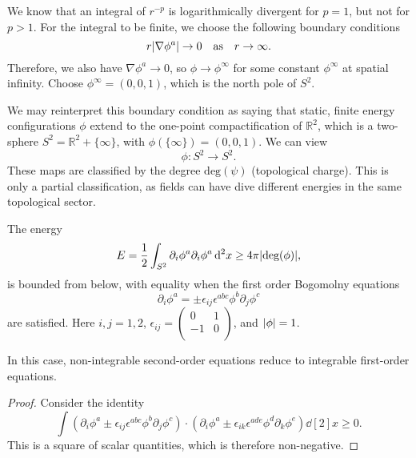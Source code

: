 We know that an integral of $r^{-p}$ is logarithmically divergent for $p = 1$, but not for $p > 1$.
For the integral to be finite, we choose the following boundary conditions
\begin{equation}
  r \abs{\nabla \phi^{a}} \to 0 \quad \text{as} \quad r \to \infty.
\end{equation}
Therefore, we also have $\nabla \phi^{a} \to 0$, so $\phi \to \phi^{\infty}$ for some constant $\phi^\infty$ at spatial infinity.
Choose $\phi^\infty = (0,0,1)$, which is the north pole of $S^2$.

We may reinterpret this boundary condition as saying that static, finite energy configurations $\phi$ extend to the one-point compactification of $\mathbb{R}^2$, which is a two-sphere $S^2 = \mathbb{R}^2 + \{\infty\}$, with $\phi(\{\infty\}) = (0,0,1)$.
We can view
\begin{equation}
  \phi \colon S^2 \to S^2.
\end{equation}
These maps are classified by the degree $\text{deg}(\psi)$ (topological charge). 
This is only a partial classification, as fields can have dive different energies in the same topological sector.

\begin{claim}
  The energy
  \begin{equation}
    E = \frac{1}{2} \int_{S^2} \partial_{i} \phi^{a} \partial_{i} \phi^{a} \dd[2]{x} \geq 4 \pi \abs{\text{deg}(\phi)},
  \end{equation}
  is bounded from below, with equality when the first order Bogomolny equations
  \begin{equation}
    \boxed{\partial_{i} \phi^{a} = \pm \epsilon_{ij} \epsilon^{abc} \phi^{b} \partial_{j} \phi^{c}}
  \end{equation}
  are satisfied. Here $i, j = 1, 2$, $\epsilon_{ij} = 
  \begin{pmatrix}
   0 & 1 \\
   -1 & 0 \\
  \end{pmatrix}$, and $\abs{ \phi} = 1$.
\end{claim}
\begin{leftbar}
  In this case, non-integrable second-order equations reduce to integrable first-order equations.
\end{leftbar}
\begin{proof}
  Consider the identity
  \begin{equation}
    \label{eq:11-id}
    \int (\partial_{i} \phi^{a} \pm \epsilon_{ij} \epsilon^{abc} \phi^{b} \partial_{j} \phi^{c}) \cdot (\partial_{i} \phi^{a} \pm \epsilon_{ik} \epsilon^{ade} \phi^{d} \partial_{k} \phi^{e}) \dd[2]{x} \geq 0.
  \end{equation}
  This is a square of scalar quantities, which is therefore non-negative.
\end{proof}
